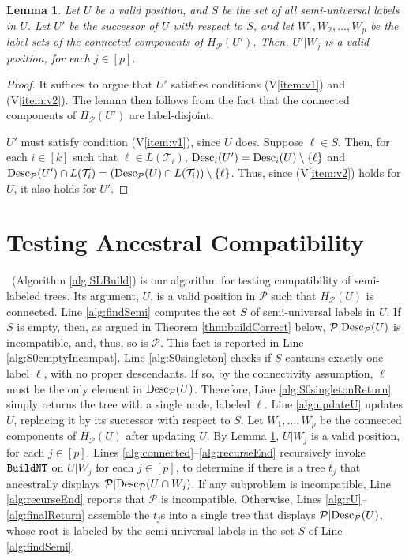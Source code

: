 \documentclass[11pt]{article}
\newcommand{\DG}{\ensuremath{H_\P}} \newcommand{\GBNT}{\ensuremath{G_{\mathtt{BNT}}}}
\renewcommand{\P}{\ensuremath{\mathcal{P}}}
\newcommand{\T}{\ensuremath{\mathcal{T}}}
\newtheorem{lemma}{Lemma}
\theoremstyle{definition}
\begin{document}
\begin{lemma}\label{lm:childOfU}
Let $U$ be a valid position, and $S$ be the set of all semi-universal labels in $U$.  Let $U'$ be the successor of $U$ with respect to $S$, and let $W_1, W_2, \dots, W_p$ be the label sets of the connected components of $\DG(U')$.  Then, $U' | W_j$ is a valid position, for each $j \in [p]$. 
\end{lemma}

\begin{proof}
It suffices to argue that $U'$ satisfies conditions (V\ref{item:v1}) and  (V\ref{item:v2}).  The lemma then follows from  the fact that the connected components of $\DG(U')$ are label-disjoint.

$U'$ must satisfy condition (V\ref{item:v1}), since $U$ does. Suppose $\ell \in S$.  Then, for each $i \in [k]$ such that $\ell \in L(\T_i)$, $\mathrm{Desc}_i(U') = \mathrm{Desc}_i(U) \setminus \{\ell\}$ and $ \Desc_\P(U') \cap L(\T_i) =(\Desc_\P(U) \cap L(\T_i)) \setminus \{\ell\}$.  Thus, since (V\ref{item:v2}) holds for $U$, it also holds for $U'$.
\end{proof}


\section{Testing Ancestral Compatibility}\label{sec:testAC}

\SLBuild\ (Algorithm \ref{alg:SLBuild}) is our algorithm for testing compatibility of semi-labeled trees.  Its argument, $U$, is a valid position in $\P$ such that $H_\P(U)$ is connected.  Line \ref{alg:findSemi} computes the set $S$ of semi-universal labels in $U$.  If $S$ is empty, then, as argued in Theorem \ref{thm:buildCorrect} below, $\P|\Desc_\P(U)$ is incompatible, and, thus, so is $\P$.  This fact is reported in Line \ref{alg:S0emptyIncompat}.  Line \ref{alg:S0singleton} checks if $S$ contains exactly one label $\ell$, with no proper descendants.  If so, by the connectivity assumption, $\ell$ must be the only element in $\Desc_\P(U)$.  Therefore, Line \ref{alg:S0singletonReturn} simply returns the tree with a single node, labeled $\ell$. Line \ref{alg:updateU} updates $U$, replacing it by its successor with respect to $S$.  Let $W_1, \dots, W_p$ be the connected components of $\DG(U)$ after updating $U$.
By Lemma \ref{lm:childOfU}, $U | W_j$ is a valid position, for each $j \in [p]$. 
Lines \ref{alg:connected}--\ref{alg:recurseEnd} recursively invoke $\texttt{BuildNT}$ on  $U | W_j$ for each $j \in [p]$, to determine if there is a tree $t_j$ that ancestrally displays $\P| \Desc_\P(U \cap W_j)$.  If any subproblem is incompatible, Line \ref{alg:recurseEnd} reports that $\P$ is incompatible.  Otherwise, Lines \ref{alg:rU}--\ref{alg:finalReturn} assemble the $t_j$s into a single tree that displays $\P|\Desc_\P(U)$, whose root is labeled by the semi-universal labels in the set $S$ of Line \ref{alg:findSemi}.
\end{document}
